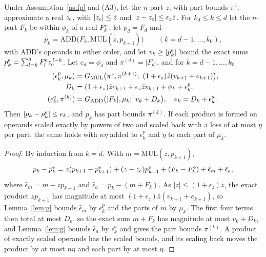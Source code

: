 \begin{lemma}\label{lem:horner}
Under Assumption~\ref{as:fp} and (A3), let the $n$-part $z$, with part bounds $\pi^z$, approximate a real $z_{\rm e}$, with
$|z_{\rm e}| \le \bar z$ and $|z - z_{\rm e}| \le \epsilon_z\bar z$. For $k_0 \le k \le d$ let the $n$-part $F_k$ be
within $\phi_k$ of a real $F^{\rm e}_k$, let $p_d = F_d$ and
\[
p_k = \mathrm{ADD}\bigl(F_k, \mathrm{MUL}(z, p_{k+1})\bigr) \qquad (k = d-1, \dots, k_0),
\]
with ADD's operands in either order, and let $v_k \ge |p^{\rm e}_k|$ bound the exact sums $p^{\rm e}_k =
\sum_{l=k}^{d} F^{\rm e}_lz_{\rm e}^{\,l-k}$. Let $e_d = \phi_d$ and $\pi^{(d)} = |F_d|$, and for $k = d-1, \dots, k_0$
\begin{align*}
(\epsilon^p_k, \mu_k) &= G_{\rm MUL}\bigl(\pi^z, \pi^{(k+1)};\ (1+\epsilon_z)\bar z(v_{k+1} + e_{k+1})\bigr), \\
D_k &= (1+\epsilon_z)\bar ze_{k+1} + \epsilon_z\bar zv_{k+1} + \phi_k + \epsilon^p_k, \\
(\epsilon^a_k, \pi^{(k)}) &= G_{\rm ADD}\bigl(|F_k|, \mu_k;\ v_k + D_k\bigr), \quad e_k = D_k + \epsilon^a_k.
\end{align*}
Then $|p_k - p^{\rm e}_k| \le e_k$, and $p_k$ has part bounds $\pi^{(k)}$. If each product is formed on operands scaled
exactly by powers of two and scaled back with a loss of at most $\eta$ per part, the same holds with $n\eta$ added to
$\epsilon^p_k$ and $\eta$ to each part of $\mu_k$.
\end{lemma}

\begin{proof}
By induction from $k = d$. With $m = \mathrm{MUL}(z, p_{k+1})$,
\[
p_k - p^{\rm e}_k = z(p_{k+1} - p^{\rm e}_{k+1}) + (z - z_{\rm e})p^{\rm e}_{k+1} + (F_k - F^{\rm e}_k) + \hat\epsilon_m
+ \hat\epsilon_a,
\]
where $\hat\epsilon_m = m - zp_{k+1}$ and $\hat\epsilon_a = p_k - (m + F_k)$. As $|z| \le (1+\epsilon_z)\bar z$, the
exact product $zp_{k+1}$ has magnitude at most $(1+\epsilon_z)\bar z(v_{k+1} + e_{k+1})$, so Lemma~\ref{lem:g} bounds
$\hat\epsilon_m$ by $\epsilon^p_k$ and the parts of $m$ by $\mu_k$. The first four terms then total at most $D_k$, so
the exact sum $m + F_k$ has magnitude at most $v_k + D_k$, and Lemma~\ref{lem:g} bounds $\hat\epsilon_a$ by
$\epsilon^a_k$ and gives the part bounds $\pi^{(k)}$. A product of exactly scaled operands has the scaled bounds, and
its scaling back moves the product by at most $n\eta$ and each part by at most $\eta$.
\end{proof}

